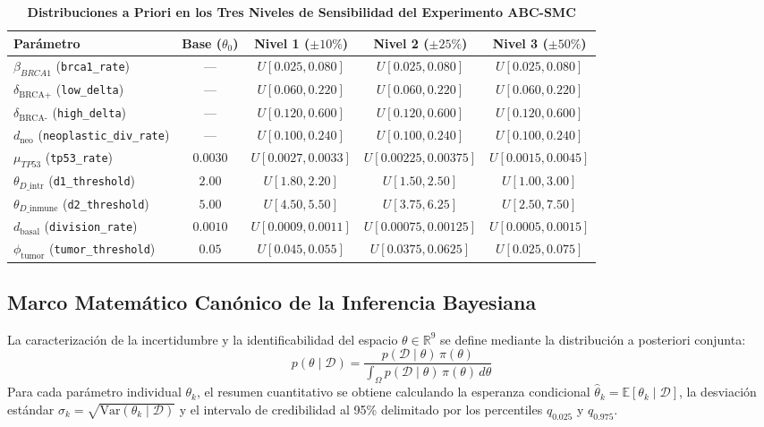 \documentclass[10pt,a4paper]{article}
\begin{document}
\begin{table}[h!]
\centering
\small
\caption{\textbf{Distribuciones a Priori en los Tres Niveles de Sensibilidad del Experimento ABC-SMC}}
\begin{tabular}{lcccc}
\toprule
\textbf{Parámetro} & \textbf{Base ($\theta_0$)} & \textbf{Nivel 1 ($\pm10\%$)} & \textbf{Nivel 2 ($\pm25\%$)} & \textbf{Nivel 3 ($\pm50\%$)} \\
\midrule
$\beta_{BRCA1}$ (\texttt{brca1\_rate}) & --- & $U[0.025, 0.080]$ & $U[0.025, 0.080]$ & $U[0.025, 0.080]$ \\
$\delta_{\text{BRCA+}}$ (\texttt{low\_delta}) & --- & $U[0.060, 0.220]$ & $U[0.060, 0.220]$ & $U[0.060, 0.220]$ \\
$\delta_{\text{BRCA-}}$ (\texttt{high\_delta}) & --- & $U[0.120, 0.600]$ & $U[0.120, 0.600]$ & $U[0.120, 0.600]$ \\
$d_{\text{neo}}$ (\texttt{neoplastic\_div\_rate}) & --- & $U[0.100, 0.240]$ & $U[0.100, 0.240]$ & $U[0.100, 0.240]$ \\
$\mu_{TP53}$ (\texttt{tp53\_rate}) & $0.0030$ & $U[0.0027, 0.0033]$ & $U[0.00225, 0.00375]$ & $U[0.0015, 0.0045]$ \\
$\theta_{D\text{\_intr}}$ (\texttt{d1\_threshold}) & $2.00$ & $U[1.80, 2.20]$ & $U[1.50, 2.50]$ & $U[1.00, 3.00]$ \\
$\theta_{D\text{\_inmune}}$ (\texttt{d2\_threshold}) & $5.00$ & $U[4.50, 5.50]$ & $U[3.75, 6.25]$ & $U[2.50, 7.50]$ \\
$d_{\text{basal}}$ (\texttt{division\_rate}) & $0.0010$ & $U[0.0009, 0.0011]$ & $U[0.00075, 0.00125]$ & $U[0.0005, 0.0015]$ \\
$\phi_{\text{tumor}}$ (\texttt{tumor\_threshold}) & $0.05$ & $U[0.045, 0.055]$ & $U[0.0375, 0.0625]$ & $U[0.025, 0.075]$ \\
\bottomrule
\end{tabular}
\label{tab:priors}
\end{table}

\subsection{Marco Matemático Canónico de la Inferencia Bayesiana}

La caracterización de la incertidumbre y la identificabilidad del espacio $\theta \in \mathbb{R}^9$ se define mediante la distribución a posteriori conjunta:
\begin{equation}
    p(\theta \mid \mathcal{D}) = \frac{p(\mathcal{D} \mid \theta) \, \pi(\theta)}{\int_{\Omega} p(\mathcal{D} \mid \theta) \, \pi(\theta) \, d\theta}
\end{equation}
Para cada parámetro individual $\theta_k$, el resumen cuantitativo se obtiene calculando la esperanza condicional $\hat{\theta}_k = \mathbb{E}[\theta_k \mid \mathcal{D}]$, la desviación estándar $\sigma_k = \sqrt{\text{Var}(\theta_k \mid \mathcal{D})}$ y el intervalo de credibilidad al 95\% delimitado por los percentiles $q_{0.025}$ y $q_{0.975}$.
\end{document}
